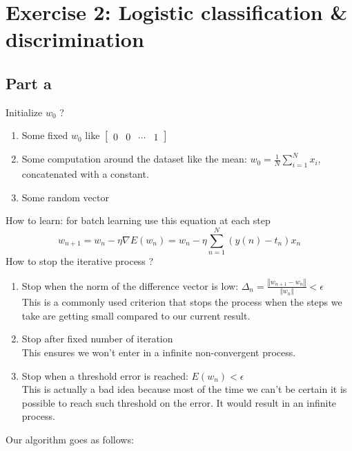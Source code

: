 \documentclass[a4paper, 10pt]{article}
\begin{document}
\section{Exercise 2: Logistic classification \& discrimination}

\subsection{Part a}
Initialize $w_0$ ?
\begin{enumerate}
    \item Some fixed $w_0$ like $\begin{bmatrix}0 & 0 & \cdots & 1\end{bmatrix}$
    \item Some computation around the dataset like the mean: $w_0 = \frac{1}{N}\sum_{i=1}^N x_i$, concatenated with a constant.
    \item Some random vector
\end{enumerate}
How to learn: for batch learning use this equation at each step
$$
w_{n+1} = w_n - \eta \nabla E(w_n) = w_n - \eta \sum_{n=1}^{N}\left(y(n)-t_n\right)x_n
$$
How to stop the iterative process ?
\begin{enumerate}
\item Stop when the norm of the difference vector is low: $\Delta_n = \frac{\left\Vert w_{n+1} - w_n\right\Vert}{\left\Vert w_n \right\Vert} < \epsilon$
\\
This is a commonly used criterion that stops the process when the steps we take are getting small compared to our current result.
\item Stop after fixed number of iteration
\\
This ensures we won't enter in a infinite non-convergent process. 
\item Stop when a threshold error is reached: $E(w_n) < \epsilon $
\\
This is actually a bad idea because most of the time we can't be certain it is possible to reach such threshold on the error.
It would result in an infinite process.
\end{enumerate}
Our algorithm goes as follows:
\end{document}
